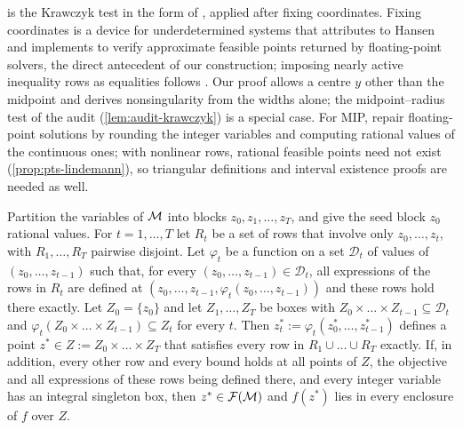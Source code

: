  is the Krawczyk test \citep{krawczyk1969-newton-algorithmen-zur-bestimmung-von} in the form of \citet[Thm.~13.3]{rump2010-verification-methods-rigorous-results-using}, applied after fixing coordinates.
Fixing coordinates is a device for underdetermined systems that \citet[Sect.~3]{kearfott1998-on-proving-existence-of-feasible} attributes to Hansen and implements to verify approximate feasible points returned by floating-point solvers, the direct antecedent of our  construction; imposing nearly active inequality rows as equalities follows \citet[Sect.~3.2]{fullner2024-feasibility-verification-and-upper-bound}.
Our proof allows a centre $y$ other than the midpoint and derives nonsingularity from the widths alone; the midpoint--radius test of the audit (\cref{lem:audit-krawczyk}) is a special case.
For MIP, \citet[Sect.~2.2]{hoen2025-analyzing-the-numerical-correctness-of} repair floating-point solutions by rounding the integer variables and computing rational values of the continuous ones; with nonlinear rows, rational feasible points need not exist (\cref{prop:pts-lindemann}), so triangular definitions and interval existence proofs are needed as well.

\begin{proposition}\label{prop:pts-triangular}
Partition the variables of $\mathcal{M}$ into blocks $z_0,z_1,\dots,z_T$, and give the seed block $z_0$ rational values.
For $t=1,\dots,T$ let $R_t$ be a set of rows that involve only $z_0,\dots,z_t$, with $R_1,\dots,R_T$ pairwise disjoint.
Let $\varphi_t$ be a function on a set $\mathcal{D}_t$ of values of $(z_0,\dots,z_{t-1})$ such that, for every $(z_0,\dots,z_{t-1})\in\mathcal{D}_t$, all expressions of the rows in $R_t$ are defined at $(z_0,\dots,z_{t-1},\varphi_t(z_0,\dots,z_{t-1}))$ and these rows hold there exactly.
Let $Z_0=\{z_0\}$ and let $Z_1,\dots,Z_T$ be boxes with $Z_0\times\dots\times Z_{t-1}\subseteq\mathcal{D}_t$ and $\varphi_t(Z_0\times\dots\times Z_{t-1})\subseteq Z_t$ for every $t$.
Then $z^*_t:=\varphi_t(z^*_0,\dots,z^*_{t-1})$ defines a point $z^*\in Z:=Z_0\times\dots\times Z_T$ that satisfies every row in $R_1\cup\dots\cup R_T$ exactly.
If, in addition, every other row and every bound holds at all points of $Z$, the objective and all expressions of these rows being defined there, and every integer variable has an integral singleton box, then $z^*\in\mathcal{F}(\mathcal{M})$ and $f(z^*)$ lies in every enclosure of $f$ over $Z$.
\end{proposition}

